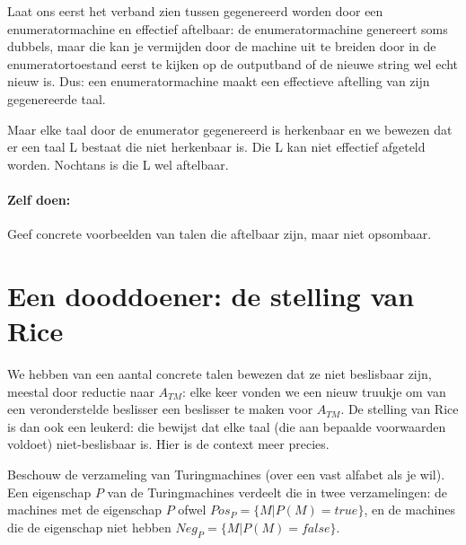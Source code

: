 Laat ons eerst het verband zien tussen gegenereerd worden door een
enumeratormachine en effectief aftelbaar: de enumeratormachine
genereert soms dubbels, maar die kan je vermijden door de machine uit
te breiden door in de enumeratortoestand eerst te kijken op de
outputband of de nieuwe string wel echt nieuw is. Dus: een
enumeratormachine maakt een effectieve aftelling van zijn gegenereerde
taal.


Maar elke taal door de enumerator gegenereerd is herkenbaar en we
bewezen dat er een taal L bestaat die niet herkenbaar is. Die L kan
niet effectief afgeteld worden. Nochtans is die L wel aftelbaar.  

\paragraph{Zelf doen:} Geef concrete voorbeelden van talen die aftelbaar zijn, maar niet opsombaar.

\section{Een dooddoener: de stelling van Rice}

We hebben van een aantal concrete talen bewezen dat ze niet beslisbaar
zijn, meestal door reductie naar $A_{TM}$: elke keer vonden we een
nieuw truukje om van een veronderstelde beslisser een beslisser te
maken voor $A_{TM}$. De stelling van Rice is dan ook een leukerd: die
bewijst dat elke taal (die aan bepaalde voorwaarden voldoet)
niet-beslisbaar is. Hier is de context meer precies.


Beschouw de verzameling van Turingmachines (over een vast alfabet als
je wil). Een eigenschap $P$ van de Turingmachines verdeelt die in twee
verzamelingen: de machines met de eigenschap $P$ ofwel
%
$Pos_P = \{M|P(M) = true\}$, en de machines die de eigenschap niet
hebben
%
$Neg_P = \{M|P(M) = false\}$.



